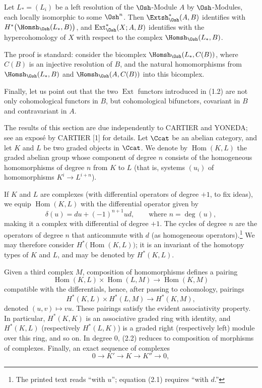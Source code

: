  Let $L_{*}=(L_i)$ be a left resolution of the
$\Osh$-Module $A$ by $\Osh$-Modules, each locally isomorphic to some $\Osh^{n}$.
Then $\Extsh_{\Osh}^{*}(A,B)$ identifies with
$H^{*}\bigl(\Homsh_{\Osh}(L_{*},B)\bigr)$, and
$\operatorname{Ext}_{\Osh}^{*}(X;A,B)$ identifies with the hypercohomology of
$X$ with respect to the complex $\Homsh_{\Osh}(L_{*},B)$.

The proof is standard: consider the bicomplex $\Homsh_{\Osh}(L_{*},C(B))$,
where $C(B)$ is an injective resolution of $B$, and the natural homomorphisms
from $\Homsh_{\Osh}(L_{*},B)$ and $\Homsh_{\Osh}(A,C(B))$ into this bicomplex.

Finally, let us point out that the two $\operatorname{Ext}$ functors introduced
in (1.2) are not only cohomological functors in $B$, but cohomological
bifunctors, covariant in $B$ and contravariant in $A$.


The results of this section are due independently to CARTIER and YONEDA; see an
exposé by CARTIER [1] for details. Let $\Ccat$ be an abelian category, and let
$K$ and $L$ be two graded objects in $\Ccat$. We denote by
$\operatorname{Hom}(K,L)$ the graded abelian group whose component of degree
$n$ consists of the homogeneous homomorphisms of degree $n$ from $K$ to $L$
(that is, systems $(u_i)$ of homomorphisms
$K^{i}\longrightarrow L^{i+n}$).

If $K$ and $L$ are complexes (with differential operators of degree $+1$, to
fix ideas), we equip $\operatorname{Hom}(K,L)$ with the differential operator
given by
\begin{equation}\tag{2.1}
  \delta(u)=du+(-1)^{n+1}ud,\qquad\text{where }n=\deg(u),
\end{equation}
making it a complex with differential of degree $+1$. The cycles of degree $n$
are the operators of degree $n$ that anticommute with $d$ (as homogeneous
operators).\footnote{The printed text reads “with $u$”; equation (2.1) requires
“with $d$.”} We may therefore consider
$H^{*}\bigl(\operatorname{Hom}(K,L)\bigr)$; it is an invariant of the homotopy
types of $K$ and $L$, and may be denoted by $H^{*}(K,L)$.

Given a third complex $M$, composition of homomorphisms defines a pairing
\[
  \operatorname{Hom}(K,L)\times\operatorname{Hom}(L,M)
  \longrightarrow\operatorname{Hom}(K,M)
\]
compatible with the differentials, hence, after passing to cohomology, pairings
\begin{equation}\tag{2.2}
  H^{*}(K,L)\times H^{*}(L,M)\longrightarrow H^{*}(K,M),
\end{equation}
denoted $(u,v)\longmapsto vu$. These pairings satisfy the evident associativity
property. In particular, $H^{*}(K,K)$ is an associative graded ring with
identity, and $H^{*}(K,L)$ (respectively $H^{*}(L,K)$) is a graded right
(respectively left) module over this ring, and so on. In degree $0$, (2.2)
reduces to composition of morphisms of complexes. Finally, an exact sequence of
complexes
\[
  0\longrightarrow K'\longrightarrow K\longrightarrow K''\longrightarrow 0,
\]
